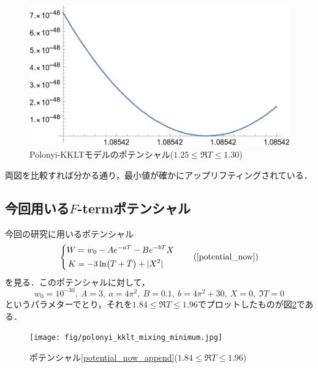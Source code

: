 \documentclass[a4paper,uplatex,dvipdfmx]{jsarticle}
\theoremstyle{definition}
\begin{document}
\begin{figure}[ht]
   \centering
   \includegraphics[keepaspectratio,width=0.8\linewidth]{fig/polonyi_kklt_minimum.jpg}   
   \caption{Polonyi-KKLTモデルのポテンシャル($1.25\leq\Re T\leq 1.30$)}
   \label{Plot_Polonyi-KKLT}
\end{figure}

両図を比較すれば分かる通り，最小値が確かにアップリフティングされている．


\subsection*{今回用いる\texorpdfstring{$F$}{F}-termポテンシャル}

今回の研究に用いるポテンシャル
\begin{equation}
   \left\{
      \begin{alignedat}{1}
         W
         &=
         w_{0}
         -
         Ae^{-aT}
         -
         Be^{-bT}X
         \\
         K
         &=
         -
         3\ln(T+\bar{T})
         +
         |X^2|
      \end{alignedat}
   \right.
   \tag*{(\ref{potential_now})}
   \label{potential_now_append}
\end{equation}
を見る．このポテンシャルに対して，
\begin{equation}
   w_{0}
   =
   10^{-30}
   ,\ 
   A=3
   ,\ 
   a=4\pi^2
   ,\ 
   B=0.1
   ,\ 
   b=4\pi^2+30
   ,\ 
   X=0
   ,\ 
   \Im T
   =
   0
   \nonumber
\end{equation}
というパラメターでとり，それを$1.84\leq\Re T\leq 1.96$でプロットしたものが図\ref{Plot_potential_now}である．

\begin{figure}[ht]
   \centering
   \texttt{[image: fig/polonyi\_kklt\_mixing\_minimum.jpg]}   
   \caption{ポテンシャル\ref{potential_now_append}($1.84\leq\Re T\leq 1.96$)}
   \label{Plot_potential_now}
\end{figure}
\end{document}
